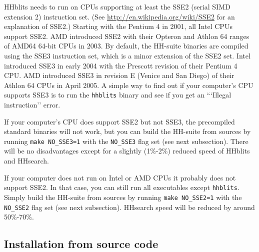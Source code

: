 \documentclass[11pt,a4paper]{article}
\begin{document}
HHblits needs to run on CPUs supporting at least the SSE2 (serial SIMD extension 2) instruction set. (See \url{http://en.wikipedia.org/wiki/SSE2} for an explanation of SSE2.) Starting with the Pentium 4 in 2001, all Intel CPUs support SSE2. AMD introduced SSE2 with their Opteron and Athlon 64 ranges of AMD64 64-bit CPUs in 2003. By default, the HH-suite binaries are compiled using the SSE3 instruction set, which is a minor extension of the SSE2 set. Intel introduced SSE3 in early 2004 with the Prescott revision of their Pentium 4 CPU. AMD introduced SSE3 in revision E (Venice and San Diego) of their Athlon 64 CPUs in April 2005. A simple way to find out if your computer's CPU supports SSE3 is to run the \verb`hhblits` binary and see if you get an ```Illegal instruction'' error.

If your computer's CPU does support SSE2 but not SSE3, the precompiled standard binaries will not work, but you can build the HH-suite from sources by running \verb`make NO_SSE3=1` with the \verb`NO_SSE3` flag set (see next subsection). There will be no disadvantages except for a slightly (1\%-2\%) reduced speed of HHblits and HHsearch.

If your computer does not run on Intel or AMD CPUs it probably does not support SSE2. In that case, you can still run all executables except \verb`hhblits`. Simply build the HH-suite from sources by running \verb`make NO_SSE2=1` with the \verb`NO_SSE2` flag set (see next subsection). HHsearch speed will be reduced by around 50\%-70\%.

\subsection{Installation from source code} 

\newenvironment{enum}
 {\begin{list}{\arabic{mycounter}.~~}{\usecounter{mycounter} \labelsep=0em \labelwidth=0em \leftmargin=0em \itemindent=0em}}
 {\end{list}}
\end{document}
